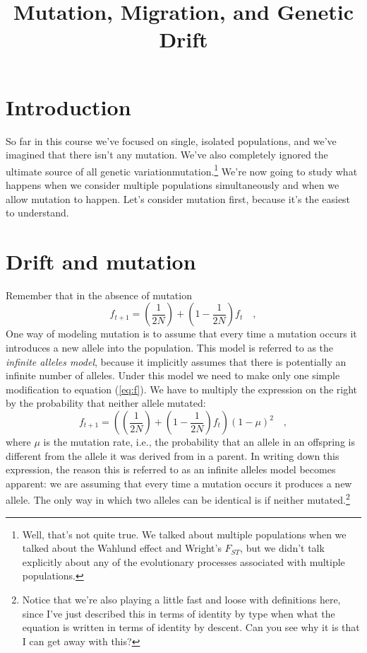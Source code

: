 \documentclass[12pt]{article}
\title{Mutation, Migration, and Genetic Drift}
\begin{document}
\maketitle

\thispagestyle{first}

\section*{Introduction}

So far in this course we've focused on single, isolated populations,
and we've imagined that there isn't any mutation. We've also
completely ignored the ultimate source of all genetic
variation{\dash}mutation.\footnote{Well, that's not quite true. We
  talked about multiple populations when we talked about the Wahlund
  effect and Wright's $F_{ST}$, but we didn't talk explicitly about
  any of the evolutionary processes associated with multiple
  populations.} We're now going to study what happens when we consider
multiple populations simultaneously and when we allow mutation to
happen. Let's consider mutation first, because it's the easiest to
understand.

\section*{Drift and mutation}

Remember that in the absence of mutation
\begin{equation}
f_{t+1} = \left(\frac{1}{2N}\right) +
          \left(1 - \frac{1}{2N}\right)f_t \quad \label{eq:f} ,
\end{equation}
One way of modeling mutation is to assume that every time a mutation
occurs it introduces a new allele into the population. This model is
referred to as the {\it infinite alleles model}, because it implicitly
assumes that there is potentially an infinite number of
alleles. Under this model we
need to make only one simple modification to equation (\ref{eq:f}). We
have to multiply the expression on the right by the probability that
neither allele mutated:
\begin{equation}
f_{t+1} = \left(\left(\frac{1}{2N}\right) +
          \left(1 - \frac{1}{2N}\right)f_t\right)(1-\mu)^2 \quad
\label{eq:f-mu} ,
\end{equation}
where $\mu$ is the mutation rate, i.e., the probability that an allele
in an offspring is different from the allele it was derived from in a
parent. In writing down this expression, the reason this is referred
to as an infinite alleles model becomes apparent: we are assuming that
every time a mutation occurs it produces a new allele. The only way in
which two alleles can be identical is if neither
mutated.\footnote{Notice that we're also playing a little fast and
  loose with definitions here, since I've just described this in terms
  of identity by type when what the equation is written in terms of
  identity by descent. Can you see why it is that I can get away with
  this?}
\end{document}
